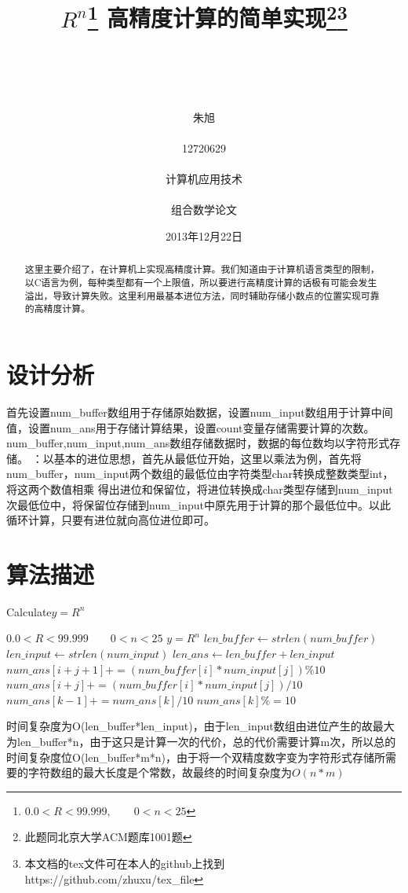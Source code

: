 \documentclass[11pt,a4paper]{article}
\title{$R^{n}$\footnote{$0.0<R<99.999,\qquad0<n<25$} 高精度计算的简单实现\footnote{此题同北京大学ACM题库1001题}\footnote{本文档的tex文件可在本人的github上找到https://github.com/zhuxu/tex\_file}}
\author{\\ \\ \\ \\ 朱旭\\ \\12720629\\ \\计算机应用技术\\ \\组合数学论文}
\date{2013年12月22日}
\begin{document}
\begin{CJK*}{UTF8}{gbsn}%


\maketitle
\newpage %

\renewcommand{\abstractname}{摘\qquad 要} %
\begin{abstract}
这里主要介绍了，在计算机上实现高精度计算。我们知道由于计算机语言类型的限制，以C语言为例，每种类型都有一个上限值，所以要进行高精度计算的话极有可能会发生溢出，导致计算失败。这里利用最基本进位方法，同时辅助存储小数点的位置实现可靠的高精度计算。
\end{abstract}

\section{设计分析}
首先设置num\_buffer数组用于存储原始数据，设置num\_input数组用于计算中间值，设置num\_ans用于存储计算结果，设置count变量存储需要计算的次数。num\_buffer,num\_input,num\_ans数组存储数据时，数据的每位数均以字符形式存储。
\newline{}：以基本的进位思想，首先从最低位开始，这里以乘法为例，首先将num\_buffer，num\_input两个数组的最低位由字符类型char转换成整数类型int，将这两个数值相乘
得出进位和保留位，将进位转换成char类型存储到num\_input次最低位中，将保留位存储到num\_input中原先用于计算的那个最低位中。以此循环计算，只要有进位就向高位进位即可。
\section{算法描述}
\begin{algorithm}
\caption{Calculate\qquad$y=R^n$}
\begin{algorithmic}
\REQUIRE $0.0<R<99.999\qquad0<n<25$
\ENSURE $y = R^n$
\STATE $len\_buffer \leftarrow strlen(num\_buffer)$
\STATE $len\_input \leftarrow strlen(num\_input)$
\STATE $len\_ans \leftarrow len\_buffer + len\_input$
\STATE $num\_ans[i+j+1] += (num\_buffer[i]*num\_input[j])\%10$
\STATE $num\_ans[i+j] += (num\_buffer[i]*num\_input[j])/10$
\ENDFOR
{}
\STATE $num\_ans[k-1]  += num\_ans[k]/10$
\STATE $num\_ans[k]  \%=10$
\ENDIF
\ENDFOR
\ENDFOR
\end{algorithmic}
\end{algorithm}
时间复杂度为O(len\_buffer*len\_input)，由于len\_input数组由进位产生的故最大为len\_buffer*n，由于这只是计算一次的代价，总的代价需要计算m次，所以总的时间复杂度位O(len\_buffer*m*n)，由于将一个双精度数字变为字符形式存储所需要的字符数组的最大长度是个常数，故最终的时间复杂度为$O(n*m)$

\end{CJK*}
\end{document}
